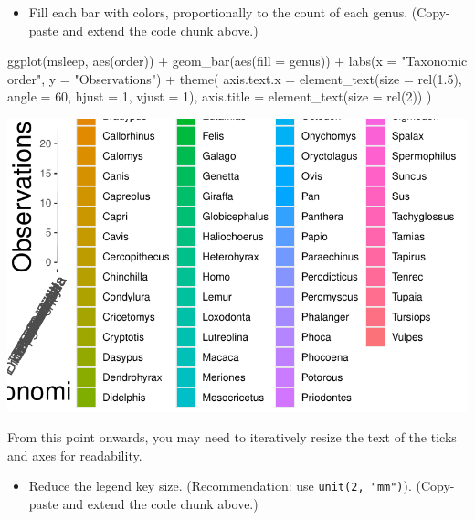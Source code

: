 \documentclass[
  letterpaper,
  DIV=11,
  numbers=noendperiod]{scrartcl}
\newenvironment{Shaded}{\begin{snugshade}}{\end{snugshade}}
\newcommand{\AttributeTok}[1]{\textcolor[rgb]{0.40,0.45,0.13}{#1}}
\newcommand{\DecValTok}[1]{\textcolor[rgb]{0.68,0.00,0.00}{#1}}
\newcommand{\FloatTok}[1]{\textcolor[rgb]{0.68,0.00,0.00}{#1}}
\newcommand{\FunctionTok}[1]{\textcolor[rgb]{0.28,0.35,0.67}{#1}}
\newcommand{\NormalTok}[1]{\textcolor[rgb]{0.00,0.23,0.31}{#1}}
\newcommand{\SpecialCharTok}[1]{\textcolor[rgb]{0.37,0.37,0.37}{#1}}
\newcommand{\StringTok}[1]{\textcolor[rgb]{0.13,0.47,0.30}{#1}}
\providecommand{\tightlist}{%
  \setlength{\itemsep}{0pt}\setlength{\parskip}{0pt}}\usepackage{longtable,booktabs,array}
\begin{document}
\begin{itemize}
\tightlist
\item
  Fill each bar with colors, proportionally to the count of each genus.
  (Copy-paste and extend the code chunk above.)
\end{itemize}

\begin{Shaded}
\begin{Highlighting}[]
\FunctionTok{ggplot}\NormalTok{(msleep, }\FunctionTok{aes}\NormalTok{(order)) }\SpecialCharTok{+}
  \FunctionTok{geom\_bar}\NormalTok{(}\FunctionTok{aes}\NormalTok{(}\AttributeTok{fill =}\NormalTok{ genus)) }\SpecialCharTok{+}
  \FunctionTok{labs}\NormalTok{(}\AttributeTok{x =} \StringTok{"Taxonomic order"}\NormalTok{, }\AttributeTok{y =} \StringTok{"Observations"}\NormalTok{) }\SpecialCharTok{+}
  \FunctionTok{theme}\NormalTok{(}
    \AttributeTok{axis.text.x =} \FunctionTok{element\_text}\NormalTok{(}\AttributeTok{size =} \FunctionTok{rel}\NormalTok{(}\FloatTok{1.5}\NormalTok{), }\AttributeTok{angle =} \DecValTok{60}\NormalTok{, }\AttributeTok{hjust =} \DecValTok{1}\NormalTok{, }\AttributeTok{vjust =} \DecValTok{1}\NormalTok{),}
    \AttributeTok{axis.title =} \FunctionTok{element\_text}\NormalTok{(}\AttributeTok{size =} \FunctionTok{rel}\NormalTok{(}\DecValTok{2}\NormalTok{))}
\NormalTok{    ) }
\end{Highlighting}
\end{Shaded}

\includegraphics{5-ggplot2_kevin_files/figure-pdf/unnamed-chunk-20-1.pdf}

From this point onwards, you may need to iteratively resize the text of
the ticks and axes for readability.

\begin{itemize}
\tightlist
\item
  Reduce the legend key size. (Recommendation: use
  \texttt{unit(2,\ "mm")}). (Copy-paste and extend the code chunk
  above.)
\end{itemize}
\end{document}
